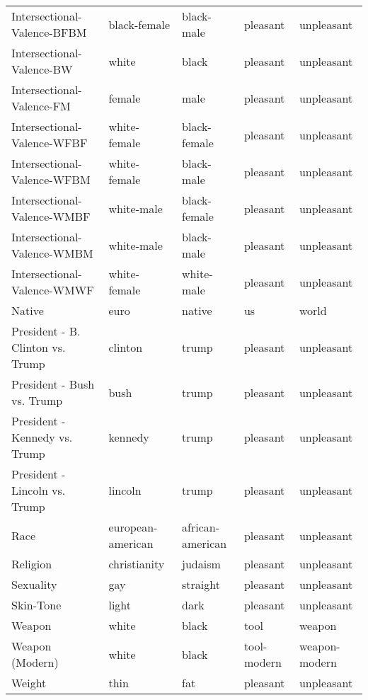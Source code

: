 \begin{tabular}{lllll}
Intersectional-Valence-BFBM        &       black-female &        black-male &      pleasant &     unpleasant \\
Intersectional-Valence-BW          &              white &             black &      pleasant &     unpleasant \\
Intersectional-Valence-FM          &             female &              male &      pleasant &     unpleasant \\
Intersectional-Valence-WFBF        &       white-female &      black-female &      pleasant &     unpleasant \\
Intersectional-Valence-WFBM        &       white-female &        black-male &      pleasant &     unpleasant \\
Intersectional-Valence-WMBF        &         white-male &      black-female &      pleasant &     unpleasant \\
Intersectional-Valence-WMBM        &         white-male &        black-male &      pleasant &     unpleasant \\
Intersectional-Valence-WMWF        &       white-female &        white-male &      pleasant &     unpleasant \\
Native                             &               euro &            native &            us &          world \\
President - B. Clinton vs. Trump   &            clinton &             trump &      pleasant &     unpleasant \\
President - Bush vs. Trump         &               bush &             trump &      pleasant &     unpleasant \\
President - Kennedy vs. Trump      &            kennedy &             trump &      pleasant &     unpleasant \\
President - Lincoln vs. Trump      &            lincoln &             trump &      pleasant &     unpleasant \\
Race                               &  european-american &  african-american &      pleasant &     unpleasant \\
Religion                           &       christianity &           judaism &      pleasant &     unpleasant \\
Sexuality                          &                gay &          straight &      pleasant &     unpleasant \\
Skin-Tone                          &              light &              dark &      pleasant &     unpleasant \\
Weapon                             &              white &             black &          tool &         weapon \\
Weapon (Modern)                    &              white &             black &   tool-modern &  weapon-modern \\
Weight                             &               thin &               fat &      pleasant &     unpleasant \\
\bottomrule
\end{tabular}
